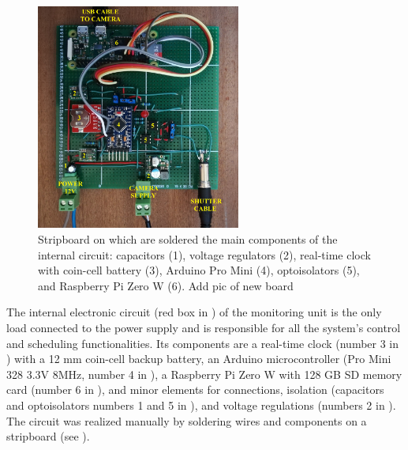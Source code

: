 \begin{figure}[ht!]
  \centering
  \includegraphics[width=0.6\textwidth]{board.jpg}
  \caption{Stripboard on which are soldered the main components of the internal
    circuit: capacitors (1), voltage regulators (2), real-time clock with coin-cell
    battery (3), Arduino Pro Mini (4), optoisolators (5), and Raspberry Pi Zero W (6).
      {\color{red} Add pic of new board}}
  \label{fig:4:circuit}
\end{figure}

The internal electronic circuit (red box in ) of the
monitoring unit is the only load connected to the power supply and is responsible for all
the system's control and scheduling functionalities.
Its components are a real-time clock (number 3 in ) with a 12
mm
coin-cell backup battery, an Arduino microcontroller (Pro  Mini 328 3.3V 8MHz, number 4
in ), a Raspberry Pi Zero W with 128 GB SD memory card (number
6 in ), and minor elements for connections, isolation (capacitors and optoisolators numbers 1 and 5 in ), and voltage regulations (numbers 2 in ).
The circuit was realized manually by soldering wires and components on a stripboard (see ).

